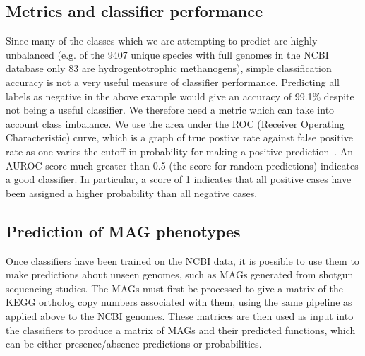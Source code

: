 \documentclass[10pt,letterpaper]{article}
\begin{document}
\subsection*{Metrics and classifier performance}
Since many of the classes which we are attempting to predict are highly unbalanced (e.g. of the 9407 unique species with full genomes in the NCBI database only 83 are hydrogentotrophic methanogens), simple classification accuracy is not a very useful measure of classifier performance. Predicting all labels as negative in the above example would give an accuracy of 99.1\% despite not being a useful classifier. We therefore need a metric which can take into account class imbalance. We use the area under the ROC (Receiver Operating Characteristic) curve, which is a graph of true postive rate against false positive rate as one varies the cutoff in probability for making a positive prediction~\cite{Fawcett2006,Flach2011}. An AUROC score much greater than 0.5 (the score for random predictions) indicates a good classifier. In particular, a score of 1 indicates that all positive cases have been assigned a higher probability than all negative cases.

\subsection*{Prediction of MAG phenotypes}
Once classifiers have been trained on the NCBI data, it is possible to use them to make predictions about unseen genomes, such as MAGs generated from shotgun sequencing studies. The MAGs must first be processed to give a matrix of the KEGG ortholog copy numbers associated with them, using the same pipeline as applied above to the NCBI genomes. These matrices are then used as input into the classifiers to produce a matrix of MAGs and their predicted functions, which can be either presence/absence predictions or probabilities. 
\end{document}
